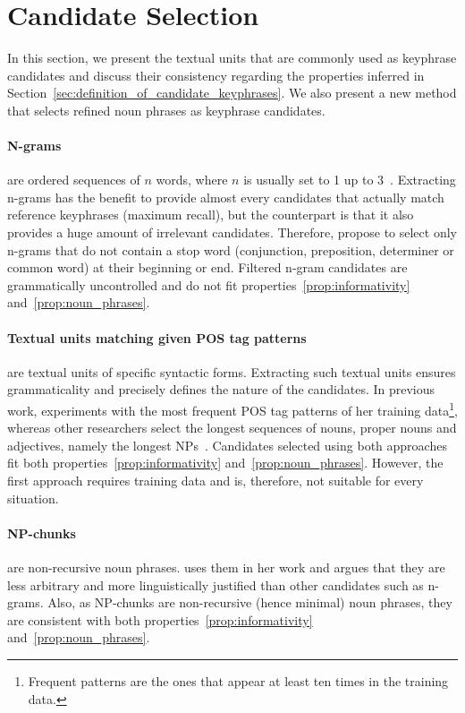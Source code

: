 \section{Candidate Selection}
\label{sec:candidate_extraction}
  In this section, we present the textual units that are commonly used as
  keyphrase candidates and discuss their consistency regarding the properties
  inferred in Section~\ref{sec:definition_of_candidate_keyphrases}. We also
  present a new method that selects refined noun phrases as keyphrase
  candidates.

  \paragraph{N-grams} are ordered sequences of $n$ words, where $n$ is usually
  set to 1 up to 3~\cite{witten1999kea}. Extracting n-grams has the benefit to
  provide almost every candidates that actually match reference keyphrases
  (maximum recall), but the counterpart is that it also provides a huge amount
  of irrelevant candidates. Therefore,  propose to
  select only n-grams that do not contain a stop word (conjunction, preposition,
  determiner or common word) at their beginning or end. Filtered n-gram
  candidates are grammatically uncontrolled and do not fit
  properties~\ref{prop:informativity} and~\ref{prop:noun_phrases}.

  \paragraph{Textual units matching given POS tag patterns} are textual units of
  specific syntactic forms. Extracting such textual units ensures grammaticality
  and precisely defines the nature of the candidates. In previous work,
   experiments with the most frequent POS
  tag patterns of her training data\footnote{Frequent patterns are the ones that
  appear at least ten times in the training data.}, whereas other researchers
  select the longest sequences of nouns, proper nouns and adjectives, namely
  the longest NPs~\cite{hassan2010conundrums}. Candidates selected using both
  approaches fit both properties~\ref{prop:informativity}
  and~\ref{prop:noun_phrases}. However, the first approach requires training
  data and is, therefore, not suitable for every situation.

  \paragraph{NP-chunks} are non-recursive noun phrases.
   uses them in her work and argues that
  they are less arbitrary and more linguistically justified than other
  candidates such as n-grams. Also, as NP-chunks are non-recursive (hence
  minimal) noun phrases, they are consistent with both
  properties~\ref{prop:informativity} and~\ref{prop:noun_phrases}.

